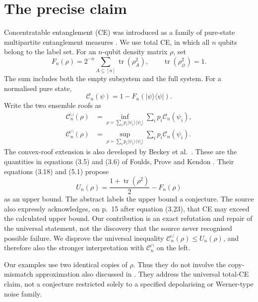 \documentclass[11pt,a4paper]{article}
\newcommand{\tr}{\operatorname{tr}}
\newcommand{\CE}{\mathcal C}
\newcommand{\ket}[1]{\lvert #1\rangle}
\newcommand{\bra}[1]{\langle #1\rvert}
\newcommand{\proj}[1]{\ket{#1}\bra{#1}}
\begin{document}
\section{The precise claim}
Concentratable entanglement (CE) was introduced as a family of pure-state multipartite entanglement measures \cite{beckey2021}. We use total CE, in which all $n$ qubits belong to the label set. For an $n$-qubit density matrix $\rho$, set
\begin{equation}\label{eq:F}
 F_n(\rho)=2^{-n}\sum_{A\subseteq[n]}\tr(\rho_A^2),
 \qquad \tr(\rho_\varnothing^2)=1.
\end{equation}
The sum includes both the empty subsystem and the full system. For a normalised pure state,
\begin{equation}\label{eq:pure}
 \CE_n(\psi)=1-F_n(\proj{\psi}).
\end{equation}
Write the two ensemble roofs as
\begin{align}
 \CE_n^\cup(\rho)&=\inf_{\rho=\sum_i p_i\proj{\psi_i}}
                       \sum_i p_i\CE_n(\psi_i),\label{eq:cup}\\
 \CE_n^\cap(\rho)&=\sup_{\rho=\sum_i p_i\proj{\psi_i}}
                       \sum_i p_i\CE_n(\psi_i).\label{eq:cap}
\end{align}
The convex-roof extension is also developed by Beckey et al.\ \cite[eq.~(10)]{beckey2023}. These are the quantities in equations (3.5) and (3.6) of Foulds, Prove and Kendon \cite{foulds2024}. Their equations (3.18) and (5.1) propose
\begin{equation}\label{eq:U}
 U_n(\rho)=\frac{1+\tr(\rho^2)}{2}-F_n(\rho)
\end{equation}
as an upper bound. The abstract labels the upper bound a conjecture. The source also expressly acknowledges, on p.~15 after equation (3.23), that CE may exceed the calculated upper bound. Our contribution is an exact refutation and repair of the universal statement, not the discovery that the source never recognised possible failure. We disprove the universal inequality $\CE_n^\cup(\rho)\leq U_n(\rho)$, and therefore also the stronger interpretation with $\CE_n^\cap$ on the left.

Our examples use two identical copies of $\rho$. Thus they do not involve the copy-mismatch approximation also discussed in \cite{foulds2024}. They address the universal total-CE claim, not a conjecture restricted solely to a specified depolarising or Werner-type noise family.
\end{document}
